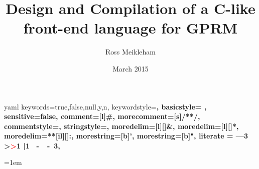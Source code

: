 \documentclass{l4proj}
\begin{document}
\makeatletter

\newcommand\language@yaml{yaml}

\expandafter\expandafter\expandafter\lstdefinelanguage
\expandafter{\language@yaml}
{
  keywords={true,false,null,y,n},
  keywordstyle=\color{darkgray}\bfseries,
                basicstyle=%
                \ttfamily
                \lst@ifdisplaystyle\scriptsize\fi,
  sensitive=false,
  comment=[l]{\#},
  morecomment=[s]{/*}{*/},
  commentstyle=\color{purple}\ttfamily,
  stringstyle=\YAMLvaluestyle\ttfamily,
  moredelim=[l][\color{orange}]{\&},
  moredelim=[l][\color{magenta}]{*},
  moredelim=**[il][\YAMLcolonstyle{:}\YAMLvaluestyle]{:},   %
  morestring=[b]',
  morestring=[b]",
  literate =    {---}{{\ProcessThreeDashes}}3
                {>}{{\textcolor{red}\textgreater}}1     
                {|}{{\textcolor{red}\textbar}}1 
                {\ -\ }{{\mdseries\ -\ }}3,
}


\title{Design and Compilation of a C-like front-end language for GPRM}
\author{Ross Meikleham}
\date{March 2015}
\maketitle


\educationalconsent

\tableofcontents

\setlength{\parindent}{0pt}









\emergencystretch=1em
\raggedright


\end{document}
